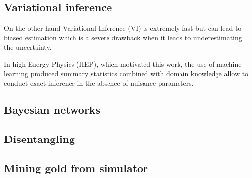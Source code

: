 \subsection{Variational inference} %
\label{sub:variational_inference}


On the other hand Variational Inference (VI) is extremely fast but can lead to biased estimation which is a severe drawback when it leads to underestimating the uncertainty.

In high Energy Physics (HEP), which motivated this work, the use of machine learning produced summary statistics combined with domain knowledge allow to conduct exact inference in the absence of nuisance parameters.






\subsection{Bayesian networks} %
\label{sub:bayesian_networks}







\subsection{Disentangling} %
\label{sub:disentangling}







\subsection{Mining gold from simulator} %
\label{sub:mining_gold_from_simulator}



